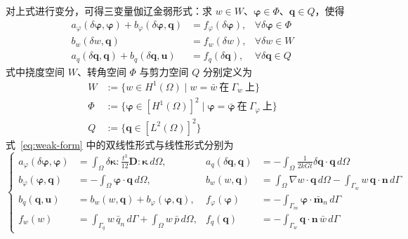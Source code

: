 \documentclass[internationalmaster]{hquThesis}
\begin{document}
对上式进行变分，可得三变量伽辽金弱形式：求 $w\in W$、$\boldsymbol\varphi\in\Phi$、$\boldsymbol q\in Q$，使得
\begin{equation}
    \begin{aligned}
        a_\varphi(\delta \boldsymbol \varphi, \boldsymbol \varphi) + b_{\varphi}(\delta\boldsymbol \varphi,\boldsymbol q) &= f_{\varphi}(\delta \boldsymbol \varphi), & \forall \delta \boldsymbol \varphi \in \Phi \\
        b_{w}(\delta w,\boldsymbol q) &= f_{w}(\delta w), & \forall \delta w \in W \\
        a_q(\delta \boldsymbol q,\boldsymbol q) + b_q(\delta \boldsymbol q,\boldsymbol u) &= f_{q}(\delta \boldsymbol q), & \forall \delta \boldsymbol q \in Q
    \end{aligned}
    \label{eq:weak-form}
\end{equation}
式中挠度空间 $W$、转角空间 $\Phi$ 与剪力空间 $Q$ 分别定义为
\begin{equation}
    \begin{aligned}
        W &:= \bigl\{w\in H^1(\Omega)\mid w=\bar{w}\ \text{在}\ \Gamma_w\ \text{上}\bigr\}\\
        \Phi &:= \bigl\{\boldsymbol\varphi\in[H^1(\Omega)]^2\mid \boldsymbol\varphi=\bar{\boldsymbol\varphi}\ \text{在}\ \Gamma_\varphi\ \text{上}\bigr\}\\
        Q &:= \bigl\{\boldsymbol q\in[L^2(\Omega)]^2\bigr\}
    \end{aligned}
    \label{eq:spaces}
\end{equation}
式~\eqref{eq:weak-form} 中的双线性形式与线性形式分别为
\begin{equation}
    \left\{
    \begin{aligned}
        a_\varphi(\delta\boldsymbol\varphi,\boldsymbol\varphi) &= \int_\Omega \delta\boldsymbol\kappa:\frac{t^3}{12}\boldsymbol D:\boldsymbol\kappa\,d\Omega, &
        a_q(\delta\boldsymbol q,\boldsymbol q) &= -\int_\Omega \frac{1}{2kGt}\delta\boldsymbol q\cdot\boldsymbol q\,d\Omega\\
        b_\varphi(\boldsymbol\varphi,\boldsymbol q) &= -\int_\Omega \boldsymbol\varphi\cdot\boldsymbol q\,d\Omega, &
        b_w(w,\boldsymbol q) &= \int_\Omega \nabla w\cdot\boldsymbol q\,d\Omega-\int_{\Gamma_w} w\,\boldsymbol q\cdot\boldsymbol n\,d\Gamma\\
        b_q(\boldsymbol q,\boldsymbol u) &= b_w(w,\boldsymbol q)+b_\varphi(\boldsymbol\varphi,\boldsymbol q), &
        f_\varphi(\boldsymbol\varphi) &= -\int_{\Gamma_m}\boldsymbol\varphi\cdot\bar{\boldsymbol m}_n\,d\Gamma\\
        f_w(w) &= \int_{\Gamma_q} w\,\bar{q}_n\,d\Gamma+\int_\Omega w\,\bar{p}\,d\Omega, &
        f_q(\boldsymbol q) &= -\int_{\Gamma_w}\boldsymbol q\cdot\boldsymbol n\,\bar{w}\,d\Gamma
    \end{aligned}
    \right.
    \label{eq:forms}
\end{equation}
\end{document}
